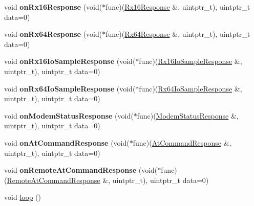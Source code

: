 \begin{DoxyCompactItemize}
\item 
\hypertarget{class_x_bee_with_callbacks_aac33b0171796babc04c317c2ac4c0ba0}{}\label{class_x_bee_with_callbacks_aac33b0171796babc04c317c2ac4c0ba0} 
void {\bfseries on\+Rx16\+Response} (void($\ast$func)(\hyperlink{class_rx16_response}{Rx16\+Response} \&, uintptr\+\_\+t), uintptr\+\_\+t data=0)
\item 
\hypertarget{class_x_bee_with_callbacks_aa2e75189434b4e59831a12dd5b5fab70}{}\label{class_x_bee_with_callbacks_aa2e75189434b4e59831a12dd5b5fab70} 
void {\bfseries on\+Rx64\+Response} (void($\ast$func)(\hyperlink{class_rx64_response}{Rx64\+Response} \&, uintptr\+\_\+t), uintptr\+\_\+t data=0)
\item 
\hypertarget{class_x_bee_with_callbacks_af205a513e7570258478c6c6e6c2f815b}{}\label{class_x_bee_with_callbacks_af205a513e7570258478c6c6e6c2f815b} 
void {\bfseries on\+Rx16\+Io\+Sample\+Response} (void($\ast$func)(\hyperlink{class_rx16_io_sample_response}{Rx16\+Io\+Sample\+Response} \&, uintptr\+\_\+t), uintptr\+\_\+t data=0)
\item 
\hypertarget{class_x_bee_with_callbacks_a8199354716ddf671b4726efba638a856}{}\label{class_x_bee_with_callbacks_a8199354716ddf671b4726efba638a856} 
void {\bfseries on\+Rx64\+Io\+Sample\+Response} (void($\ast$func)(\hyperlink{class_rx64_io_sample_response}{Rx64\+Io\+Sample\+Response} \&, uintptr\+\_\+t), uintptr\+\_\+t data=0)
\item 
\hypertarget{class_x_bee_with_callbacks_ae7211d3c7a99bad23e63a5dfbbf4b11c}{}\label{class_x_bee_with_callbacks_ae7211d3c7a99bad23e63a5dfbbf4b11c} 
void {\bfseries on\+Modem\+Status\+Response} (void($\ast$func)(\hyperlink{class_modem_status_response}{Modem\+Status\+Response} \&, uintptr\+\_\+t), uintptr\+\_\+t data=0)
\item 
\hypertarget{class_x_bee_with_callbacks_a44fbc2a39ff0b85eaa33e6b49dbd5c19}{}\label{class_x_bee_with_callbacks_a44fbc2a39ff0b85eaa33e6b49dbd5c19} 
void {\bfseries on\+At\+Command\+Response} (void($\ast$func)(\hyperlink{class_at_command_response}{At\+Command\+Response} \&, uintptr\+\_\+t), uintptr\+\_\+t data=0)
\item 
\hypertarget{class_x_bee_with_callbacks_a7a4ea0701ce4c376f492f723c992c322}{}\label{class_x_bee_with_callbacks_a7a4ea0701ce4c376f492f723c992c322} 
void {\bfseries on\+Remote\+At\+Command\+Response} (void($\ast$func)(\hyperlink{class_remote_at_command_response}{Remote\+At\+Command\+Response} \&, uintptr\+\_\+t), uintptr\+\_\+t data=0)
\item 
void \hyperlink{class_x_bee_with_callbacks_aec6a4688f09fef714c377ede587b5ba9}{loop} ()

\end{DoxyCompactItemize}
